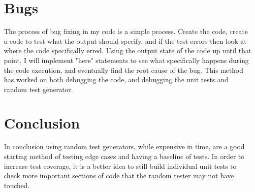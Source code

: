 \documentclass[letterpaper,10pt,onecolumn,draftclsnofoot]{IEEEtran}
\begin{document}
\section{Bugs}
The process of bug fixing in my code is a simple process. Create the code, create a code to test what the output should specify, and if the test errors then look at where the code specifically erred. Using the output state of the code up until that point, I will implement "here" statements to see what specifically happens during the code execution, and eventually find the root cause of the bug. This method has worked on both debugging the code, and debugging the unit tests and random test generator.

\section{Conclusion}
In conclusion using random test generators, while expensive in time, are a good starting method of testing edge cases and having a baseline of tests. In order to increase test coverage, it is a better idea to still build individual unit tests to check more important sections of code that the random tester may not have touched.
\end{document}
